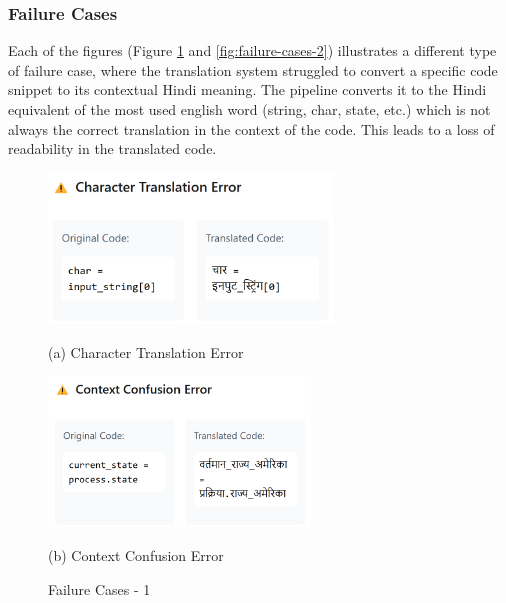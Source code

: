 \documentclass[11pt,a4paper]{article}
\begin{document}
\subsubsection{Failure Cases}
Each of the figures (Figure \ref{fig:failure-cases-1} and \ref{fig:failure-cases-2}) illustrates a different type of failure case, where the translation system struggled to convert a specific code snippet to its contextual Hindi meaning. The pipeline converts it to the Hindi equivalent of the most used english word (string, char, state, etc.) which is not always the correct translation in the context of the code. This leads to a loss of readability in the translated code.
\begin{figure}[!t]
    \centering
    \begin{minipage}{0.95\columnwidth}
        \includegraphics[width=0.7\linewidth,height=4cm,keepaspectratio]{Images/char_translation_error.png}
        \vspace{-0.2cm}
        \caption*{(a) Character Translation Error}
        \label{fig:char-translation-error}
    \end{minipage}
    \vspace{0.1cm}  
    \begin{minipage}{0.95\columnwidth}
        \includegraphics[width=0.7\linewidth,height=4cm,keepaspectratio]{Images/context_confusion_error.png}
        \vspace{-0.2cm}
        \caption*{(b) Context Confusion Error}
        \label{fig:context-confusion-error}
    \end{minipage}
    \vspace{-0.2cm}

    \caption{Failure Cases - 1}
    \label{fig:failure-cases-1}
\end{figure}
\end{document}
